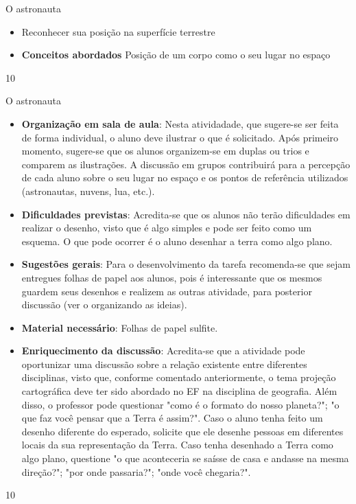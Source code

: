{\vspace{2em}
\begin{ObjetivoEsp}{O astronauta}
{
\begin{itemize}
\item Reconhecer sua posição na superfície terrestre
\item \textbf{Conceitos abordados} Posição de um corpo como o seu lugar no espaço
\end{itemize}
}
{1}{0}
\end{ObjetivoEsp}
\begin{Recomenda}{O astronauta}
{
	\begin{itemize}
	\item \textbf{Organização em sala de aula}: Nesta atividadade, que sugere-se ser feita de forma individual, o aluno deve ilustrar o que é solicitado. Após primeiro momento, sugere-se que os alunos organizem-se em duplas ou trios e comparem as ilustrações. A discussão em grupos contribuirá para a percepção de cada aluno sobre o seu lugar no espaço e os pontos de referência utilizados (astronautas, nuvens, lua, etc.).
	\item \textbf{Dificuldades previstas}: Acredita-se que os alunos não terão dificuldades em realizar o desenho, visto que é algo simples e pode ser feito como um esquema. O que pode ocorrer é o aluno desenhar a terra como algo plano.
	\item \textbf{Sugestões gerais}: Para o desenvolvimento da tarefa recomenda-se que sejam entregues folhas de papel aos alunos, pois é interessante que os mesmos guardem seus desenhos e realizem as outras atividade, para posterior discussão (ver o organizando as ideias).
	\item \textbf{Material necessário}: Folhas de papel sulfite.
	\item \textbf{Enriquecimento da discussão}: Acredita-se que a atividade pode oportunizar uma discussão sobre a relação existente entre diferentes disciplinas, visto que, conforme comentado anteriormente, o tema projeção cartográfica deve ter sido abordado no EF na disciplina de geografia. Além disso, o professor pode questionar "como é o formato do nosso planeta?"; "o que faz você pensar que a Terra é assim?". Caso o aluno tenha feito um desenho diferente do esperado, solicite que ele desenhe pessoas em diferentes locais da sua representação da Terra. Caso tenha desenhado a Terra como algo plano, questione "o que aconteceria se saísse de casa e andasse na mesma direção?"; "por onde passaria?"; "onde você chegaria?".
	\end{itemize}
}{1}{0}
\end{Recomenda}}
